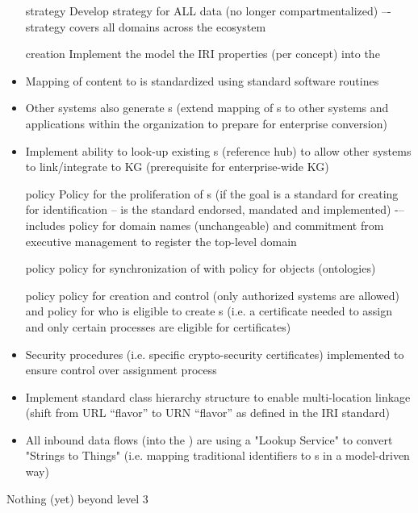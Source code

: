 \kgmmscoringlevelTwo

\begin{itemize}[leftmargin=1.5in]

  \item [strategy] Develop strategy for ALL data (no longer compartmentalized) –- strategy covers all domains across
        the ecosystem
  \item [creation] Implement the model the IRI properties (per concept) into the 
  \item Mapping of content to  is standardized using standard software routines
  \item Other systems also generate s (extend mapping of s to other systems and
        applications within the organization to prepare for enterprise conversion)
  \item Implement ability to look-up existing s (reference hub) to allow other systems to
        link/integrate to KG (prerequisite for enterprise-wide KG)
  \item [policy] Policy for the proliferation of s (if the goal is a standard for creating for
        identification -- is the standard endorsed, mandated and implemented) -– includes policy
        for domain names (unchangeable) and commitment from executive management to register the top-level domain
  \item [policy] policy for synchronization of  with policy for objects (ontologies)
  \item [policy] policy for creation and control (only authorized systems are allowed) and policy for who is
        eligible to create s (i.e. a certificate needed to assign and only certain processes are
        eligible for certificates)

\end{itemize}

\kgmmscoringlevelThree

\begin{itemize}[leftmargin=1.5in]

  \item Security procedures (i.e. specific crypto-security certificates) implemented to ensure control over
         assignment process
  \item Implement standard  class hierarchy structure to enable multi-location linkage (shift from
        URL “flavor” to URN “flavor” as defined in the IRI standard)
  \item All inbound data flows (into the ) are using a "Lookup Service" to convert "Strings to Things"
        (i.e. mapping traditional identifiers to s in a model-driven way)

\end{itemize}

Nothing (yet) beyond level 3
